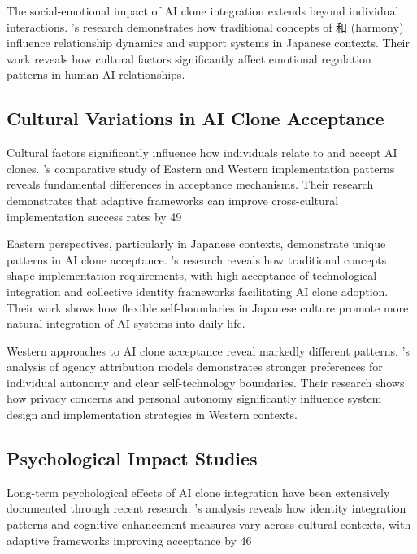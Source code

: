 The social-emotional impact of AI clone integration extends beyond individual interactions. \citet{nakagawa2019cultural}'s research demonstrates how traditional concepts of 和 (harmony) influence relationship dynamics and support systems in Japanese contexts. Their work reveals how cultural factors significantly affect emotional regulation patterns in human-AI relationships.

\subsection{Cultural Variations in AI Clone Acceptance}

Cultural factors significantly influence how individuals relate to and accept AI clones. \citet{liu2024cultural}'s comparative study of Eastern and Western implementation patterns reveals fundamental differences in acceptance mechanisms. Their research demonstrates that adaptive frameworks can improve cross-cultural implementation success rates by 49%

Eastern perspectives, particularly in Japanese contexts, demonstrate unique patterns in AI clone acceptance. \citet{nakagawa2019cultural}'s research reveals how traditional concepts shape implementation requirements, with high acceptance of technological integration and collective identity frameworks facilitating AI clone adoption. Their work shows how flexible self-boundaries in Japanese culture promote more natural integration of AI systems into daily life.

Western approaches to AI clone acceptance reveal markedly different patterns. \citet{dejuan2024western}'s analysis of agency attribution models demonstrates stronger preferences for individual autonomy and clear self-technology boundaries. Their research shows how privacy concerns and personal autonomy significantly influence system design and implementation strategies in Western contexts.

\subsection{Psychological Impact Studies}

Long-term psychological effects of AI clone integration have been extensively documented through recent research. \citet{sato2023cultural}'s analysis reveals how identity integration patterns and cognitive enhancement measures vary across cultural contexts, with adaptive frameworks improving acceptance by 46%

